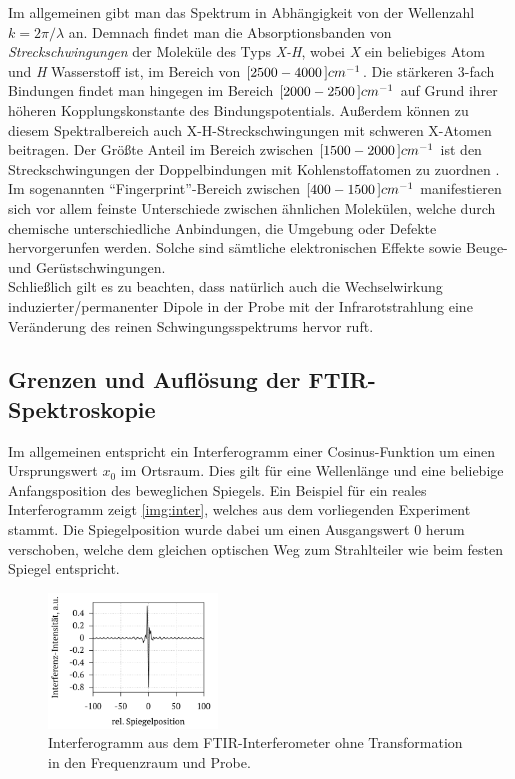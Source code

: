 \documentclass[a4paper,10pt,twocolumn]{article}
\newcommand{\ix}[1]{_\text{#1}}
\newcommand{\tilt}[1]{\textit{#1}}
\begin{document}
		Im allgemeinen gibt man das Spektrum in Abh\"angigkeit von der Wellenzahl $k=2\pi/\lambda$ an. Demnach findet man die Absorptionsbanden von \tilt{Streckschwingungen} der Molek\"ule des Typs \tilt{X-H}, wobei \tilt{X} ein beliebiges Atom und \tilt{H} Wasserstoff ist, im Bereich von $\unit[[2500-4000]]{cm^{-1}}$. Die st\"arkeren 3-fach Bindungen findet man hingegen im Bereich $\unit[[2000-2500]]{cm^{-1}}$ auf Grund ihrer h\"oheren Kopplungskonstante des Bindungspotentials. Au{\ss}erdem k\"onnen zu diesem Spektralbereich auch X-H-Streckschwingungen mit schweren X-Atomen beitragen. Der Gr\"o{\ss}te Anteil im Bereich zwischen $\unit[[1500-2000]]{cm^{-1}}$ ist den Streckschwingungen der Doppelbindungen mit Kohlenstoffatomen zu zuordnen \cite{FTIRAns}.\\
		Im sogenannten ``Fingerprint''-Bereich zwischen $\unit[[400-1500]]{cm^{-1}}$ manifestieren sich vor allem feinste Unterschiede zwischen \"ahnlichen Molek\"ulen, welche durch chemische unterschiedliche Anbindungen, die Umgebung oder Defekte hervorgerunfen werden. Solche sind s\"amtliche elektronischen Effekte sowie Beuge- und Ger\"ustschwingungen.\\
		Schlie{\ss}lich gilt es zu beachten, dass nat\"urlich auch die Wechselwirkung induzierter/permanenter Dipole in der Probe mit der Infrarotstrahlung eine Ver\"anderung des reinen Schwingungsspektrums hervor ruft.
		
	\subsection{Grenzen und Aufl\"osung der FTIR-Spektroskopie}
	
		Im allgemeinen entspricht ein Interferogramm einer Cosinus-Funktion um einen Ursprungswert $x\ix{0}$ im Ortsraum. Dies gilt f\"ur eine Wellenl\"ange und eine beliebige Anfangsposition des beweglichen Spiegels. Ein Beispiel f\"ur ein reales Interferogramm zeigt \autoref{img:inter}, welches aus dem vorliegenden Experiment stammt. Die Spiegelposition wurde dabei um einen Ausgangswert 0 herum verschoben, welche dem gleichen optischen Weg zum Strahlteiler wie beim festen Spiegel entspricht.
		
		\begin{figure}[h]
			\centering
			\includegraphics[width=0.4\textwidth]{Gruppe2A/inter.pdf}
			\caption{Interferogramm aus dem FTIR-Interferometer ohne Transformation in den Frequenzraum und Probe.}
			\label{img:inter}
		\end{figure}
	
\end{document}

